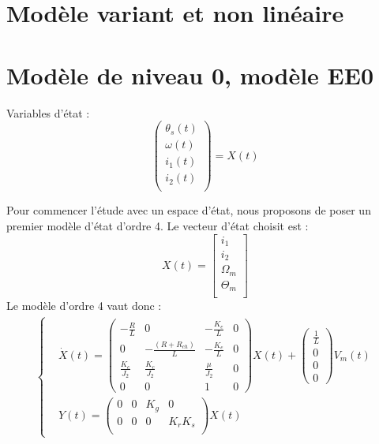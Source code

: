 \section{Modèle variant et non linéaire}


\section{Modèle de niveau 0, modèle EE0}
\hspace{5mm} \textbullet \hspace{5mm} Variables d'état :
\begin{equation}
\begin{pmatrix}
\theta_s(t)\\
\omega(t)\\
i_1(t)\\
i_2(t)\\
\end{pmatrix}
=
X(t)
\end{equation}


Pour commencer l'étude avec un espace d'état, nous proposons de poser un premier modèle d'état d'ordre 4. Le vecteur d'état choisit est :
\begin{equation}
X(t)=\begin{bmatrix}
i_1\\
i_2\\
\Omega_m\\
\Theta_m\\
\end{bmatrix}
\end{equation} 
Le modèle d'ordre 4 vaut donc :
\begin{align}
\label{EE0}
\left\lbrace
\begin{aligned}
&\dot{X}(t) = \begin{pmatrix}
-\frac{R}{L}	& 	    0				&   -\frac{K_e}{L}	& 0\\
      0			&  -\frac{(R+R_{ch})}{L}	&	-\frac{K_e}{L}	& 0\\
\frac{K_c}{J_2}	&	\frac{K_c}{J_2}		&	\frac{\mu}{J_2}	&	0\\
0&	0&	1&	0
\end{pmatrix}X(t)+\begin{pmatrix}
\frac{1}{L}\\0\\0\\0
\end{pmatrix}V_m(t)\\
&Y(t) = \begin{pmatrix}
0&	0&	K_g	&	0\\
0&	0&	0	&	K_rK_s\\
\end{pmatrix}X(t)
\end{aligned}
\right.
\end{align}
